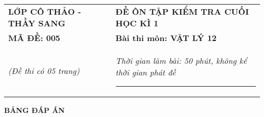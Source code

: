 \begin{tabular}{M{6.5cm}M{11cm}}
	\textbf{LỚP CÔ THẢO - THẦY SANG}& \textbf{ĐỀ ÔN TẬP KIỂM TRA CUỐI HỌC KÌ 1}\\
	\textbf{MÃ ĐỀ: 005}& \textbf{Bài thi môn: VẬT LÝ 12}\\
	\textit{(Đề thi có 05 trang)}& \textit{Thời gian làm bài: 50 phút, không kể thời gian phát đề}
	
	\noindent\rule{4cm}{0.8pt} \\
\end{tabular}
\setcounter{section}{0}
\begin{center}
	\textbf{\large BẢNG ĐÁP ÁN}
\end{center}
\section{}
\section{}
\section{}
